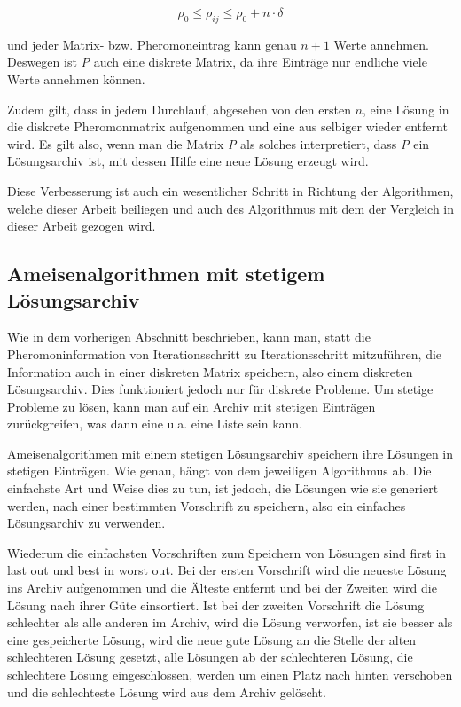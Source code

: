 \documentclass[fontsize=12, a4aper]{scrartcl}
\begin{document}
	\begin{equation}
	\rho_0 \leq \rho_{ij} \leq \rho_0 + n \cdot \delta
	\end{equation}
	
	\noindent und jeder Matrix- bzw. Pheromoneintrag kann genau \(n+1\) Werte annehmen. Deswegen ist \textit{P} auch eine diskrete Matrix, da ihre Einträge nur endliche viele Werte annehmen können.\hfill\newline
	
	Zudem gilt, dass in jedem Durchlauf, abgesehen von den ersten \(n\), eine Lösung in die diskrete Pheromonmatrix aufgenommen und eine aus selbiger wieder entfernt wird. Es gilt also, wenn man die Matrix \textit{P} als solches interpretiert, dass \textit{P} ein Lösungsarchiv ist, mit dessen Hilfe eine neue Lösung erzeugt wird.\hfill\newline
	
	Diese Verbesserung ist auch ein wesentlicher Schritt in Richtung der Algorithmen, welche dieser Arbeit beiliegen und auch des Algorithmus mit dem der Vergleich in dieser Arbeit gezogen wird.\hfill\newline
	
	\subsection{Ameisenalgorithmen mit stetigem Lösungsarchiv}
	
	Wie in dem vorherigen Abschnitt beschrieben, kann man, statt die Pheromoninformation von Iterationsschritt zu Iterationsschritt mitzuführen, die Information auch in einer diskreten Matrix speichern, also einem diskreten Lösungsarchiv. Dies funktioniert jedoch nur für diskrete Probleme. Um stetige Probleme zu lösen, kann man auf ein Archiv mit stetigen Einträgen zurückgreifen, was dann eine u.a. eine Liste sein kann.\hfill\newline
	
	Ameisenalgorithmen mit einem stetigen Lösungsarchiv speichern ihre Lösungen in stetigen Einträgen. Wie genau, hängt von dem jeweiligen Algorithmus ab. Die einfachste Art und Weise dies zu tun, ist jedoch, die Lösungen wie sie generiert werden, nach einer bestimmten Vorschrift zu speichern, also ein einfaches Lösungsarchiv zu verwenden.\hfill\newline
	
	Wiederum die einfachsten Vorschriften zum Speichern von Lösungen sind \glqq first in last out\grqq \hspace{.16667em} und \glqq best in worst out\grqq. Bei der ersten Vorschrift wird die neueste Lösung ins Archiv aufgenommen und die Älteste entfernt und bei der Zweiten wird die Lösung nach ihrer Güte einsortiert. Ist bei der zweiten Vorschrift die Lösung schlechter als alle anderen im Archiv, wird die Lösung verworfen, ist sie besser als eine gespeicherte Lösung, wird die neue gute Lösung an die Stelle der alten schlechteren Lösung gesetzt, alle Lösungen ab der schlechteren Lösung, die schlechtere Lösung eingeschlossen, werden um einen Platz nach hinten verschoben und die schlechteste Lösung wird aus dem Archiv gelöscht.\hfill\newline
	
\end{document}
